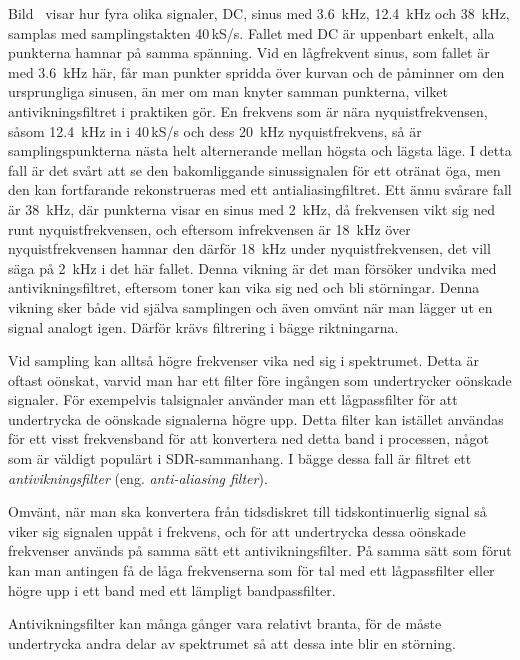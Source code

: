 Bild~ visar hur fyra olika signaler, DC, sinus med
\qty{3,6}{\kilo\hertz}, \qty{12,4}{\kilo\hertz} och \qty{38}{\kilo\hertz}, samplas
med samplingstakten 40\,kS/s.
Fallet med DC är uppenbart enkelt, alla punkterna hamnar på samma spänning.
Vid en lågfrekvent sinus, som fallet är med \qty{3,6}{\kilo\hertz} här, får man
punkter spridda över kurvan och de påminner om den ursprungliga sinusen, än mer
om man knyter samman punkterna, vilket antivikningsfiltret i praktiken gör.
En frekvens som är nära nyquistfrekvensen, såsom \qty{12,4}{\kilo\hertz} in i
40\,kS/s och dess \qty{20}{\kilo\hertz} nyquistfrekvens, så är samplingspunkterna
nästa helt alternerande mellan högsta och lägsta läge.
I detta fall är det svårt att se den bakomliggande sinussignalen för ett otränat
öga, men den kan fortfarande rekonstrueras med ett antialiasingfiltret.
Ett ännu svårare fall är \qty{38}{\kilo\hertz}, där punkterna visar en sinus med
\qty{2}{\kilo\hertz}, då frekvensen vikt sig ned runt nyquistfrekvensen, och
eftersom infrekvensen är \qty{18}{\kilo\hertz} över nyquistfrekvensen hamnar den
därför \qty{18}{\kilo\hertz} under nyquistfrekvensen, det vill säga på
\qty{2}{\kilo\hertz} i det här fallet.
Denna vikning är det man försöker undvika med antivikningsfiltret, eftersom
toner kan vika sig ned och bli störningar.
Denna vikning sker både vid själva samplingen och även omvänt när man lägger ut
en signal analogt igen. Därför krävs filtrering i bägge riktningarna.

Vid sampling kan alltså högre frekvenser vika ned sig i spektrumet.
Detta är oftast oönskat, varvid man har ett filter före ingången som
undertrycker oönskade signaler.
För exempelvis talsignaler använder man ett lågpassfilter för att undertrycka de
oönskade signalerna högre upp.
Detta filter kan istället användas för ett visst frekvensband för att
konvertera ned detta band i processen, något som är väldigt populärt i
SDR-sammanhang.
I bägge dessa fall är filtret ett \emph{antivikningsfilter} (eng.
\emph{anti-aliasing filter}).

Omvänt, när man ska konvertera från tidsdiskret till tidskontinuerlig
signal så viker sig signalen uppåt i frekvens, och för att undertrycka dessa
oönskade frekvenser används på samma sätt ett antivikningsfilter.
På samma sätt som förut kan man antingen få de låga frekvenserna som för tal
med ett lågpassfilter eller högre upp i ett band med ett lämpligt
bandpassfilter.

Antivikningsfilter kan många gånger vara relativt branta, för de måste
undertrycka andra delar av spektrumet så att dessa inte blir en störning.


